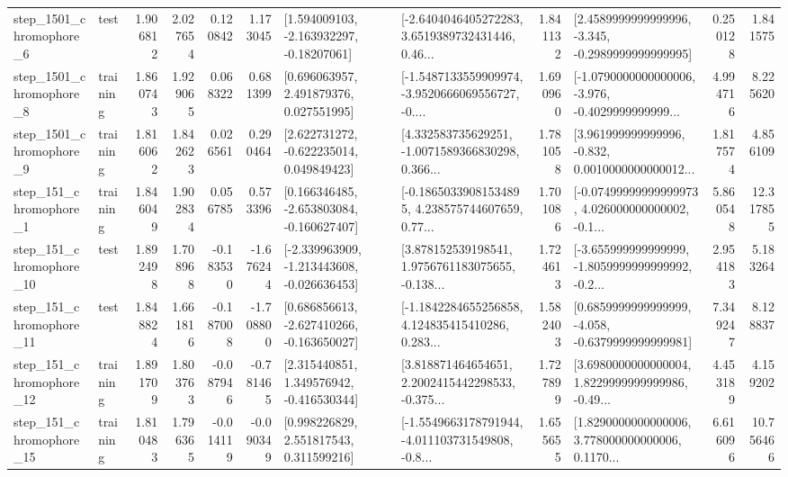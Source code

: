 \begin{tabular}{llrrrrllrlrr}
  step\_1501\_chromophore\_6 &      test &      1.906812 &    2.027654 &      0.120842 &  1.173045 &    [1.594009103, -2.163932297, -0.18207061] &  [-2.6404046405272283, 3.6519389732431446, 0.46... &       1.841132 &  [2.4589999999999996, -3.345, -0.2989999999999995] &            0.250128 &          1.841575 \\
  step\_1501\_chromophore\_8 &  training &      1.860743 &    1.929065 &      0.068322 &  0.681399 &     [0.696063957, 2.491879376, 0.027551995] &  [-1.5487133559909974, -3.9520666069556727, -0.... &       1.690960 &  [-1.0790000000000006, -3.976, -0.4029999999999... &            4.994716 &          8.225620 \\
  step\_1501\_chromophore\_9 &  training &      1.816062 &    1.842623 &      0.026561 &  0.290464 &    [2.622731272, -0.622235014, 0.049849423] &  [4.332583735629251, -1.0071589366830298, 0.366... &       1.781058 &  [3.961999999999996, -0.832, 0.0010000000000012... &            1.817574 &          4.856109 \\
   step\_151\_chromophore\_1 &  training &      1.846049 &    1.902834 &      0.056785 &  0.573396 &   [0.166346485, -2.653803084, -0.160627407] &  [-0.18650339081534895, 4.238575744607659, 0.77... &       1.701086 &  [-0.07499999999999973, 4.026000000000002, -0.1... &            5.860548 &         12.317855 \\
  step\_151\_chromophore\_10 &      test &      1.892498 &    1.708968 &     -0.183530 & -1.676244 &  [-2.339963909, -1.213443608, -0.026636453] &  [3.878152539198541, 1.9756761183075655, -0.138... &       1.724613 &  [-3.655999999999999, -1.8059999999999992, -0.2... &            2.954183 &          5.183264 \\
  step\_151\_chromophore\_11 &      test &      1.848824 &    1.661816 &     -0.187008 & -1.708800 &   [0.686856613, -2.627410266, -0.163650027] &  [-1.1842284655256858, 4.124835415410286, 0.283... &       1.582403 &  [0.6859999999999999, -4.058, -0.6379999999999981] &            7.349247 &          8.128837 \\
  step\_151\_chromophore\_12 &  training &      1.891709 &    1.803763 &     -0.087946 & -0.781465 &    [2.315440851, 1.349576942, -0.416530344] &  [3.818871464654651, 2.2002415442298533, -0.375... &       1.727899 &  [3.6980000000000004, 1.8229999999999986, -0.49... &            4.453189 &          4.159202 \\
  step\_151\_chromophore\_15 &  training &      1.810483 &    1.796365 &     -0.014119 & -0.090349 &     [0.998226829, 2.551817543, 0.311599216] &  [-1.5549663178791944, -4.011103731549808, -0.8... &       1.655655 &  [1.8290000000000006, 3.778000000000006, 0.1170... &            6.616096 &         10.756466 \\

\end{tabular}
